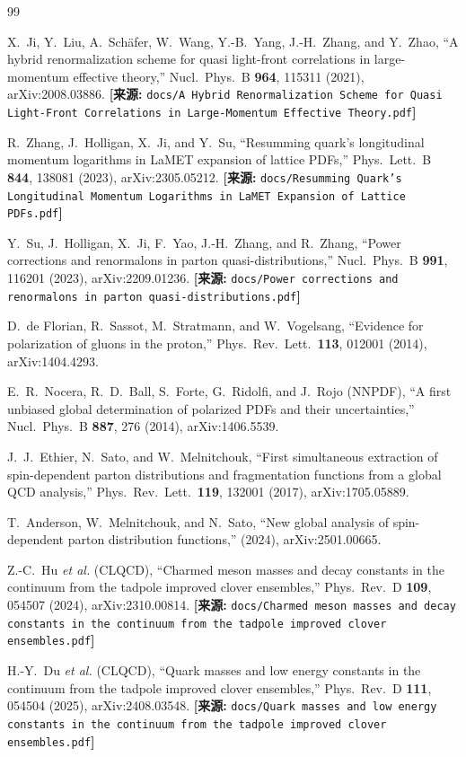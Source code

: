 \documentclass[12pt,a4paper]{ctexart}
\theoremstyle{definition}
\begin{document}
\begin{thebibliography}{99}

X.~Ji, Y.~Liu, A.~Sch\"afer, W.~Wang, Y.-B.~Yang, J.-H.~Zhang, and Y.~Zhao,
``A hybrid renormalization scheme for quasi light-front correlations in large-momentum effective theory,''
Nucl.\ Phys.\ B \textbf{964}, 115311 (2021), arXiv:2008.03886.
\quad\textbf{[来源:} \texttt{docs/A Hybrid Renormalization Scheme for Quasi Light-Front Correlations in Large-Momentum Effective Theory.pdf}\textbf{]}

R.~Zhang, J.~Holligan, X.~Ji, and Y.~Su,
``Resumming quark's longitudinal momentum logarithms in LaMET expansion of lattice PDFs,''
Phys.\ Lett.\ B \textbf{844}, 138081 (2023), arXiv:2305.05212.
\quad\textbf{[来源:} \texttt{docs/Resumming Quark's Longitudinal Momentum Logarithms in LaMET Expansion of Lattice PDFs.pdf}\textbf{]}

Y.~Su, J.~Holligan, X.~Ji, F.~Yao, J.-H.~Zhang, and R.~Zhang,
``Power corrections and renormalons in parton quasi-distributions,''
Nucl.\ Phys.\ B \textbf{991}, 116201 (2023), arXiv:2209.01236.
\quad\textbf{[来源:} \texttt{docs/Power corrections and renormalons in parton quasi-distributions.pdf}\textbf{]}


D.~de Florian, R.~Sassot, M.~Stratmann, and W.~Vogelsang,
``Evidence for polarization of gluons in the proton,''
Phys.\ Rev.\ Lett.\ \textbf{113}, 012001 (2014), arXiv:1404.4293.

E.~R.~Nocera, R.~D.~Ball, S.~Forte, G.~Ridolfi, and J.~Rojo (NNPDF),
``A first unbiased global determination of polarized PDFs and their uncertainties,''
Nucl.\ Phys.\ B \textbf{887}, 276 (2014), arXiv:1406.5539.

J.~J.~Ethier, N.~Sato, and W.~Melnitchouk,
``First simultaneous extraction of spin-dependent parton distributions and fragmentation functions from a global QCD analysis,''
Phys.\ Rev.\ Lett.\ \textbf{119}, 132001 (2017), arXiv:1705.05889.

T.~Anderson, W.~Melnitchouk, and N.~Sato,
``New global analysis of spin-dependent parton distribution functions,''
(2024), arXiv:2501.00665.


Z.-C.~Hu \textit{et al.} (CLQCD),
``Charmed meson masses and decay constants in the continuum from the tadpole improved clover ensembles,''
Phys.\ Rev.\ D \textbf{109}, 054507 (2024), arXiv:2310.00814.
\quad\textbf{[来源:} \texttt{docs/Charmed meson masses and decay constants in the continuum from the tadpole improved clover ensembles.pdf}\textbf{]}

H.-Y.~Du \textit{et al.} (CLQCD),
``Quark masses and low energy constants in the continuum from the tadpole improved clover ensembles,''
Phys.\ Rev.\ D \textbf{111}, 054504 (2025), arXiv:2408.03548.
\quad\textbf{[来源:} \texttt{docs/Quark masses and low energy constants in the continuum from the tadpole improved clover ensembles.pdf}\textbf{]}

\end{thebibliography}
\end{document}
